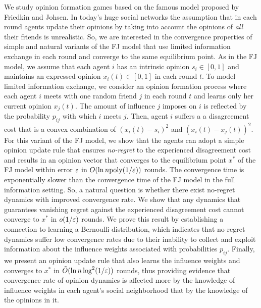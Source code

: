 We study opinion formation games based on the famous model proposed by Friedkin
and Johsen. In today's huge social networks the assumption that in each round
agents update their opinions by taking into account the opinions of
\emph{all} their friends is unrealistic. So, we are interested in the convergence 
properties of simple and natural variants of the FJ model that use limited information 
exchange in each round and converge to the same equilibrium point. 
%
As in the FJ model, we assume that each agent $i$ has an intrinsic opinion $s_i \in [0,1]$ and maintains an expressed opinion $x_i(t) \in [0,1]$ in each round $t$. To model limited information exchange, we consider an opinion formation process where each agent $i$ meets with  one random friend $j$ in each round $t$ and learns only her current opinion $x_j(t)$.  The amount of influence $j$ imposes on $i$ is reflected by the probability $p_{ij}$ with which $i$ meets $j$. Then, agent $i$ suffers a a disagreement cost that is a convex combination of $(x_i(t) - s_i)^2$ and $(x_i(t) - x_j(t))^2$. 
%
For this variant of the FJ model, we show that the agents can adopt a simple opinion update rule that ensures \emph{no-regret} to the experienced disagreement cost and results in an opinion vector that converges to the equilibrium point $x^\ast$ of the FJ model within error $\varepsilon$ in $O(\ln n \mathrm{poly}(1/\varepsilon))$ rounds.
%
The convergence time is exponentially slower than the convergence time of the FJ model in the full information setting. So, a natural question is whether there exist no-regret dynamics with improved convergence rate. We show that any dynamics that guarantees vanishing regret against the experienced disagreement cost cannot converge to $x^\ast$ in $o(1/\varepsilon)$ rounds. We prove this result by establishing a connection to learning a Bernoulli distribution, which indicates that no-regret dynamics suffer low convergence rates due to their inability to collect and exploit information about the influence weights associated with probabilities $p_{ij}$. Finally, we present an opinion update rule that also learns the influence weights and converges to $x^\ast$ in $\tilde{O}(\ln n\log^2(1/\varepsilon))$ rounds, thus providing evidence that convergence rate of opinion dynamics is affected more by the knowledge of influence weights in each agent's social neighborhood that by the knowledge of the opinions in it.   

